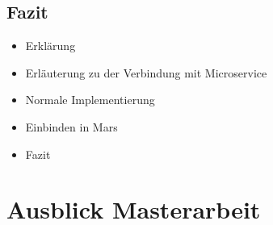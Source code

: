 \documentclass{llncs}
\begin{document}
\subsection{Fazit}
\begin{itemize}
\item Erklärung
\item Erläuterung zu der Verbindung mit Microservice
\item Normale Implementierung
\item Einbinden in Mars
\item Fazit
\end{itemize}
\section{Ausblick Masterarbeit}





\end{document}
